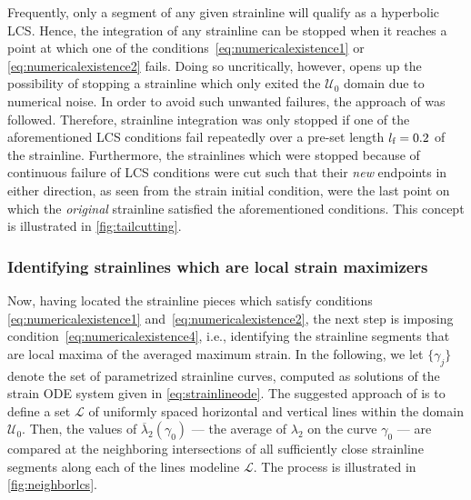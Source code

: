Frequently, only a segment of any given strainline will qualify as a hyperbolic
LCS\@. Hence, the integration of any strainline can be stopped when it reaches
a point at which one of the conditions~\eqref{eq:numericalexistence1} or
\eqref{eq:numericalexistence2} fails. Doing so uncritically, however, opens up
the possibility of stopping a strainline which only exited the $\mathcal{U}_{0}$
domain due to numerical noise. In order to avoid such unwanted failures,
the approach of \textcite{farazmand2012computing} was followed.
Therefore, strainline integration was only stopped if one of the aforementioned
LCS conditions fail repeatedly over a pre-set length $l_{\textnormal{f}}=0.2$ of
the strainline. Furthermore, the strainlines which were stopped because
of continuous failure of LCS conditions were cut such that their \emph{new}
endpoints in either direction, as seen from the strain initial condition, were
the last point on which the \emph{original} strainline satisfied the
aforementioned conditions. This concept is illustrated in
\cref{fig:tailcutting}.



\clearpage
\subsubsection{Identifying strainlines which are local strain maximizers}
\label{ssub:identifying_strainlines_which_are_local_strain_maximizers}

Now, having located the strainline pieces which satisfy conditions
\eqref{eq:numericalexistence1} and~\eqref{eq:numericalexistence2}, the next
step is imposing condition~\eqref{eq:numericalexistence4}, i.e., identifying the
strainline segments that are local maxima of the averaged maximum strain. In
the following, we let $\{\gamma_{j}\}$ denote the set of parametrized strainline
curves, computed as solutions of the strain ODE system given in
\cref{eq:strainlineode}. The suggested approach of
\textcite{farazmand2012computing} is to define a set $\mathcal{L}$ of uniformly
spaced horizontal and vertical lines within the domain $\mathcal{U}_{0}$. Then,
the values of $\overline{\lambda}_{2}(\gamma_{0})$ --- the average of
$\lambda_{2}$ on the curve $\gamma_{0}$ --- are compared at the neighboring
intersections of all sufficiently close strainline segments along each of the
lines modeline $\mathcal{L}$. The process is illustrated in
\cref{fig:neighborlcs}.



